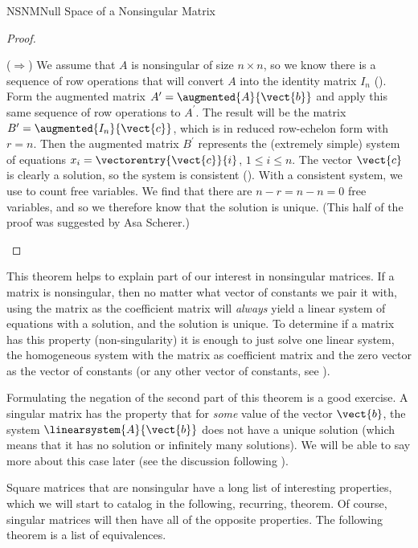 \begin{subsect}{NSNM}{Null Space of a Nonsingular Matrix}
\begin{proof}
\begin{para}($\Rightarrow$)  We assume that $A$ is nonsingular of size $n\times n$, so we know there is a sequence of row operations that will convert $A$ into the identity matrix $I_n$ ().  Form the augmented matrix $A^\prime=\augmented{A}{\vect{b}}$ and apply this same sequence of row operations to $A^\prime$.  The result will be the matrix $B^\prime=\augmented{I_n}{\vect{c}}$, which is in reduced row-echelon form with $r=n$.  Then the augmented matrix $B^\prime$ represents the (extremely simple) system of equations $x_i=\vectorentry{\vect{c}}{i}$, $1\leq i\leq n$.  The vector $\vect{c}$ is clearly a solution, so the system is consistent ().  With a consistent system, we use  to count free variables.  We find that there are $n-r=n-n=0$ free variables, and so we therefore know that the solution is unique.  (This half of the proof was suggested by Asa Scherer.)\end{para}
%
\end{proof}
%
\begin{para}This theorem helps to explain part of our interest in nonsingular matrices.  If a matrix is nonsingular, then no matter what vector of constants we pair it with, using the matrix as the  coefficient matrix will {\em always} yield a linear system of equations with a solution, and the solution is unique.    To determine if a matrix has this property (non-singularity) it is enough to just solve one linear system, the homogeneous system with the matrix as coefficient matrix and the zero vector as the vector of constants (or any other vector of constants, see ).\end{para}
%
\begin{para}Formulating the negation of the second part of this theorem is a good exercise.  A singular matrix has the property that for {\em some} value of the vector $\vect{b}$, the system $\linearsystem{A}{\vect{b}}$ does not have a unique solution (which means that it has no solution or infinitely many solutions).  We will be able to say more about this case later (see the discussion following ).\end{para}
%
\begin{para}Square matrices that are nonsingular have a long list of interesting properties, which we will start to catalog in the following, recurring, theorem.  Of course, singular matrices will then have all of the opposite properties.  The following theorem is a list of equivalences.\end{para}

\end{subsect}
